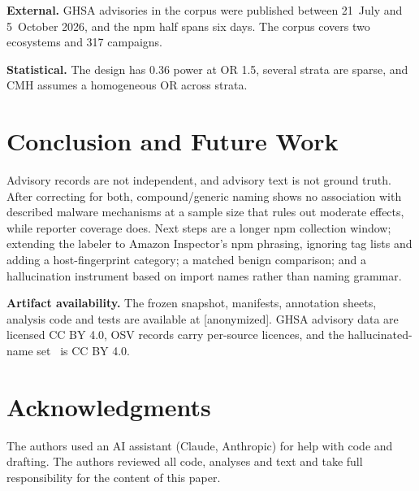 \documentclass[10pt,conference]{IEEEtran}
\begin{document}
\textbf{External.} GHSA advisories in the corpus were published between
21~July and 5~October 2026, and the npm half spans six days. The corpus
covers two ecosystems and 317 campaigns.

\textbf{Statistical.} The design has 0.36 power at OR 1.5, several strata
are sparse, and CMH assumes a homogeneous OR across strata.

\section{Conclusion and Future Work}
\label{sec:conclusion}

Advisory records are not independent, and advisory text is not ground
truth. After correcting for both, compound/generic naming shows no
association with described malware mechanisms at a sample size that rules
out moderate effects, while reporter coverage does. Next steps are a
longer npm collection window; extending the labeler to Amazon Inspector's
npm phrasing, ignoring tag lists and adding a host-fingerprint category; a
matched benign comparison; and a hallucination instrument based on import
names rather than naming grammar.

\textbf{Artifact availability.} The frozen snapshot, manifests, annotation
sheets, analysis code and tests are available at [anonymized]. GHSA
advisory data are licensed CC BY 4.0, OSV records carry per-source
licences, and the hallucinated-name set~\cite{churilov2026} is CC BY 4.0.

\section*{Acknowledgments}
The authors used an AI assistant (Claude, Anthropic) for help with code
and drafting. The authors reviewed all code, analyses and text and take
full responsibility for the content of this paper.
\end{document}
